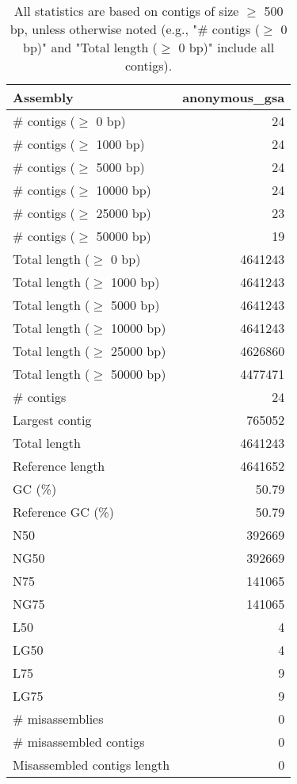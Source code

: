 \documentclass[12pt,a4paper]{article}
\begin{document}
\begin{table}[ht]
\begin{center}
\caption{All statistics are based on contigs of size $\geq$ 500 bp, unless otherwise noted (e.g., "\# contigs ($\geq$ 0 bp)" and "Total length ($\geq$ 0 bp)" include all contigs).}
\begin{tabular}{|l*{1}{|r}|}
\hline
Assembly & anonymous\_gsa \\ \hline
\# contigs ($\geq$ 0 bp) & 24 \\ \hline
\# contigs ($\geq$ 1000 bp) & 24 \\ \hline
\# contigs ($\geq$ 5000 bp) & 24 \\ \hline
\# contigs ($\geq$ 10000 bp) & 24 \\ \hline
\# contigs ($\geq$ 25000 bp) & 23 \\ \hline
\# contigs ($\geq$ 50000 bp) & 19 \\ \hline
Total length ($\geq$ 0 bp) & 4641243 \\ \hline
Total length ($\geq$ 1000 bp) & 4641243 \\ \hline
Total length ($\geq$ 5000 bp) & 4641243 \\ \hline
Total length ($\geq$ 10000 bp) & 4641243 \\ \hline
Total length ($\geq$ 25000 bp) & 4626860 \\ \hline
Total length ($\geq$ 50000 bp) & 4477471 \\ \hline
\# contigs & 24 \\ \hline
Largest contig & 765052 \\ \hline
Total length & 4641243 \\ \hline
Reference length & 4641652 \\ \hline
GC (\%) & 50.79 \\ \hline
Reference GC (\%) & 50.79 \\ \hline
N50 & 392669 \\ \hline
NG50 & 392669 \\ \hline
N75 & 141065 \\ \hline
NG75 & 141065 \\ \hline
L50 & 4 \\ \hline
LG50 & 4 \\ \hline
L75 & 9 \\ \hline
LG75 & 9 \\ \hline
\# misassemblies & 0 \\ \hline
\# misassembled contigs & 0 \\ \hline
Misassembled contigs length & 0 \\ \hline

\end{tabular}
\end{center}
\end{table}
\end{document}
